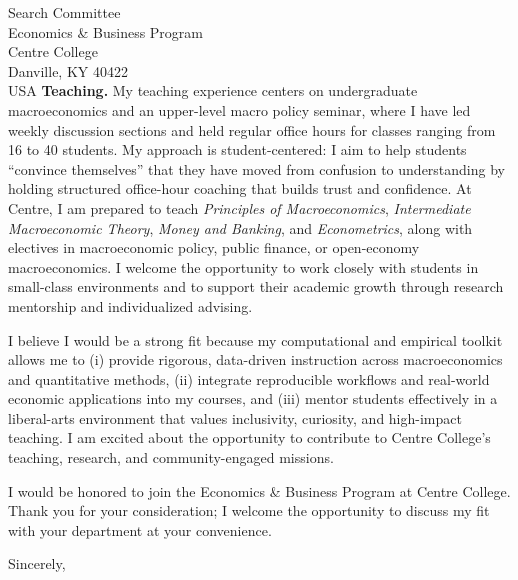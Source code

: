 \documentclass[11pt,letterpaper]{letter}
\begin{document}
\begin{letter}{Search Committee \\
Economics \& Business Program \\
Centre College \\
Danville, KY 40422 \\ USA}
\textbf{Teaching.} My teaching experience centers on undergraduate macroeconomics and an upper-level macro policy seminar, where I have led weekly discussion sections and held regular office hours for classes ranging from 16 to 40 students. My approach is student-centered: I aim to help students “convince themselves” that they have moved from confusion to understanding by holding structured office-hour coaching that builds trust and confidence. At Centre, I am prepared to teach \textit{Principles of Macroeconomics}, \textit{Intermediate Macroeconomic Theory}, \textit{Money and Banking}, and \textit{Econometrics}, along with electives in macroeconomic policy, public finance, or open-economy macroeconomics. I welcome the opportunity to work closely with students in small-class environments and to support their academic growth through research mentorship and individualized advising.

I believe I would be a strong fit because my computational and empirical toolkit allows me to (i) provide rigorous, data-driven instruction across macroeconomics and quantitative methods, (ii) integrate reproducible workflows and real-world economic applications into my courses, and (iii) mentor students effectively in a liberal-arts environment that values inclusivity, curiosity, and high-impact teaching. I am excited about the opportunity to contribute to Centre College’s teaching, research, and community-engaged missions.

I would be honored to join the Economics \& Business Program at Centre College. Thank you for your consideration; I welcome the opportunity to discuss my fit with your department at your convenience.

\closing{Sincerely,}

\end{letter}
\end{document}
